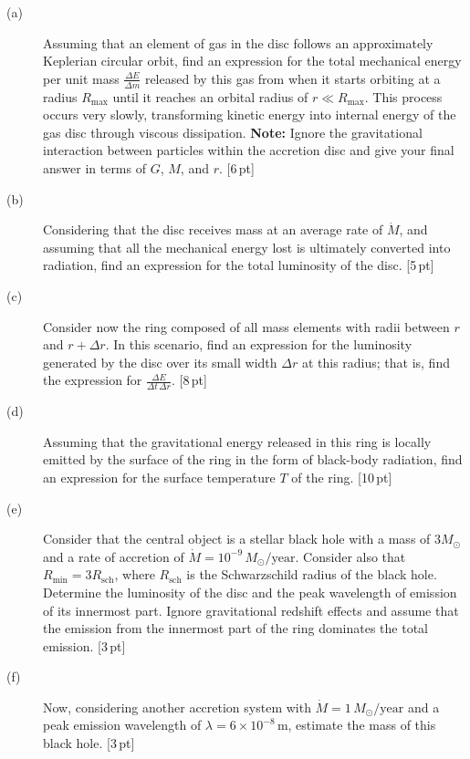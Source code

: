 \begin{description}
\item[(a)] Assuming that an element of gas in the disc follows an
  approximately Keplerian circular orbit, find an expression for the total
  mechanical energy per unit mass $\frac{\Delta E}{\Delta m}$ released by this
  gas from when it starts orbiting at a radius $R_{\mathrm{max}}$ until it
  reaches an orbital radius of $r \ll R_{\mathrm{max}}$. This process occurs
  very slowly, transforming kinetic energy into internal energy of the gas
  disc through viscous dissipation. \textbf{Note:} Ignore the gravitational
  interaction between particles within the accretion disc and give your final
  answer in terms of $G$, $M$, and $r$. \hfill[6\,pt]
\item[(b)] Considering that the disc receives mass at an average rate of
  $\dot{M}$, and assuming that all the mechanical energy lost is ultimately
  converted into radiation, find an expression for the total luminosity of the
  disc. \hfill[5\,pt]
\item[(c)] Consider now the ring composed of all mass elements with radii
  between $r$ and $r + \Delta r$. In this scenario, find an expression for the
  luminosity generated by the disc over its small width $\Delta r$ at this
  radius; that is, find the expression for
  $\frac{\Delta E}{\Delta t\,\Delta r}$. \hfill[8\,pt]
\item[(d)] Assuming that the gravitational energy released in this ring is
  locally emitted by the surface of the ring in the form of black-body
  radiation, find an expression for the surface temperature $T$ of the ring.
  \hfill[10\,pt]
\item[(e)] Consider that the central object is a stellar black hole with a
  mass of $3M_\odot$ and a rate of accretion of
  $\dot{M} = 10^{-9}\,M_\odot/\mathrm{year}$. Consider also that
  $R_{\mathrm{min}} = 3R_{\mathrm{sch}}$, where $R_{\mathrm{sch}}$ is the
  Schwarzschild radius of the black hole. Determine the luminosity of the disc
  and the peak wavelength of emission of its innermost part. Ignore
  gravitational redshift effects and assume that the emission from the
  innermost part of the ring dominates the total emission. \hfill[3\,pt]
\item[(f)] Now, considering another accretion system with
  $\dot{M} = 1\,M_\odot/\mathrm{year}$ and a peak emission wavelength of
  $\lambda = 6 \times 10^{-8}$\,m, estimate the mass of this black hole.
  \hfill[3\,pt]
\end{description}

